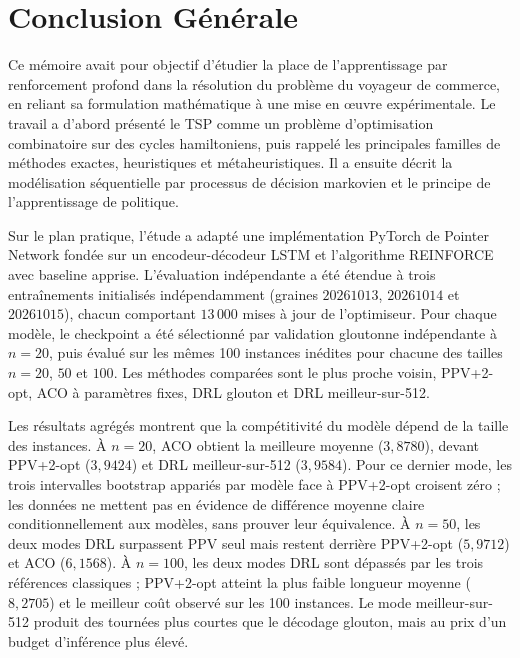 \documentclass[12pt, a4paper, twoside, openright]{book}
\begin{document}
	\chapter*{Conclusion G\'en\'erale}

Ce mémoire avait pour objectif d'étudier la place de l'apprentissage par
renforcement profond dans la résolution du problème du voyageur de commerce,
en reliant sa formulation mathématique à une mise en œuvre expérimentale.
Le travail a d'abord présenté le TSP comme un problème d'optimisation
combinatoire sur des cycles hamiltoniens, puis rappelé les principales
familles de méthodes exactes, heuristiques et métaheuristiques. Il a ensuite
décrit la modélisation séquentielle par processus de décision markovien et le
principe de l'apprentissage de politique.

Sur le plan pratique, l'étude a adapté une implémentation PyTorch de Pointer
Network fondée sur un encodeur-décodeur LSTM et l'algorithme REINFORCE avec
baseline apprise. L'évaluation indépendante a été étendue à trois entraînements
initialisés indépendamment (graines $20261013$, $20261014$ et $20261015$), chacun
comportant $13\,000$ mises à jour de l'optimiseur. Pour chaque modèle, le
checkpoint a été sélectionné par validation gloutonne indépendante à $n=20$,
puis évalué sur les mêmes 100 instances inédites pour chacune des tailles
$n=20$, $50$ et $100$. Les méthodes comparées sont le plus proche voisin,
PPV+2-opt, ACO à paramètres fixes, DRL glouton et DRL meilleur-sur-512.

Les résultats agrégés montrent que la compétitivité du modèle dépend de la
taille des instances. À $n=20$, ACO obtient la meilleure moyenne ($3{,}8780$),
devant PPV+2-opt ($3{,}9424$) et DRL meilleur-sur-512 ($3{,}9584$). Pour ce
dernier mode, les trois intervalles bootstrap appariés par modèle face à
PPV+2-opt croisent zéro ; les données ne mettent pas en évidence de différence
moyenne claire conditionnellement aux modèles, sans prouver leur équivalence.
À $n=50$, les deux modes DRL surpassent PPV seul mais restent derrière
PPV+2-opt ($5{,}9712$) et ACO ($6{,}1568$). À $n=100$, les deux modes DRL sont
dépassés par les trois références classiques ; PPV+2-opt atteint la plus
faible longueur moyenne ($8{,}2705$) et le meilleur coût observé sur les
100 instances. Le mode meilleur-sur-512 produit des tournées plus courtes que
le décodage glouton, mais au prix d'un budget d'inférence plus élevé.
\end{document}
